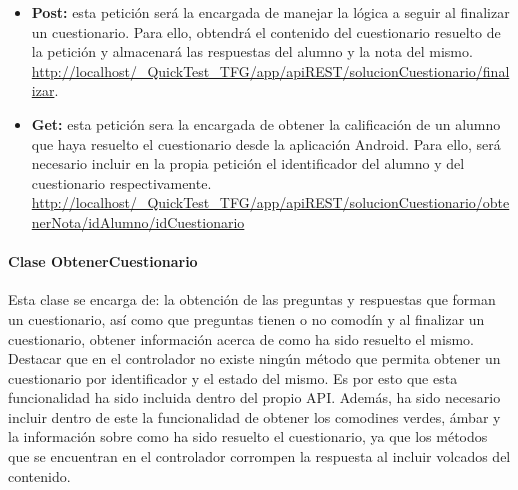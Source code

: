 \begin{itemize}

	\item \textbf{Post:} esta petición será la encargada de manejar la lógica a seguir al finalizar un cuestionario. Para ello, obtendrá el contenido del cuestionario resuelto de la petición y almacenará las respuestas del alumno y la nota del mismo. \url{http://localhost/_QuickTest_TFG/app/apiREST/solucionCuestionario/finalizar}.
	
	\item \textbf{Get:} esta petición sera la encargada de obtener la calificación de un alumno que haya resuelto el cuestionario desde la aplicación Android. Para ello, será necesario incluir en la propia petición el identificador del alumno y del cuestionario respectivamente. \url{http://localhost/_QuickTest_TFG/app/apiREST/solucionCuestionario/obtenerNota/idAlumno/idCuestionario}
\end{itemize}


\paragraph{Clase ObtenerCuestionario}

Esta clase se encarga de: la obtención de las preguntas y respuestas que forman un cuestionario, así como que preguntas tienen o no comodín y al finalizar un cuestionario, obtener información acerca de como ha sido resuelto el mismo. Destacar que en el controlador no existe ningún método que permita obtener un cuestionario por identificador y el estado del mismo. Es por esto que esta funcionalidad ha sido incluida dentro del propio API. Además, ha sido necesario incluir dentro de este la funcionalidad de obtener los comodines verdes, ámbar y la información sobre como ha sido resuelto el cuestionario, ya que los métodos que se encuentran en el controlador corrompen la respuesta al incluir volcados del contenido.


